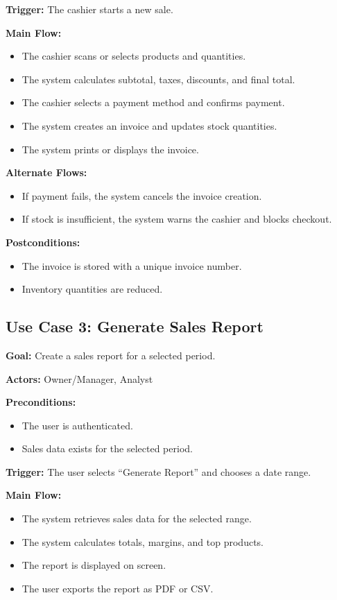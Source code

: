 \textbf{Trigger:} The cashier starts a new sale.

\textbf{Main Flow:}
\begin{itemize}
    \item The cashier scans or selects products and quantities.
    \item The system calculates subtotal, taxes, discounts, and final total.
    \item The cashier selects a payment method and confirms payment.
    \item The system creates an invoice and updates stock quantities.
    \item The system prints or displays the invoice.
\end{itemize}

\textbf{Alternate Flows:}
\begin{itemize}
    \item If payment fails, the system cancels the invoice creation.
    \item If stock is insufficient, the system warns the cashier and blocks checkout.
\end{itemize}

\textbf{Postconditions:}
\begin{itemize}
    \item The invoice is stored with a unique invoice number.
    \item Inventory quantities are reduced.
\end{itemize}

\subsection{Use Case 3: Generate Sales Report}
\textbf{Goal:} Create a sales report for a selected period.

\textbf{Actors:} Owner/Manager, Analyst

\textbf{Preconditions:}
\begin{itemize}
    \item The user is authenticated.
    \item Sales data exists for the selected period.
\end{itemize}

\textbf{Trigger:} The user selects ``Generate Report'' and chooses a date range.

\textbf{Main Flow:}
\begin{itemize}
    \item The system retrieves sales data for the selected range.
    \item The system calculates totals, margins, and top products.
    \item The report is displayed on screen.
    \item The user exports the report as PDF or CSV.
\end{itemize}

